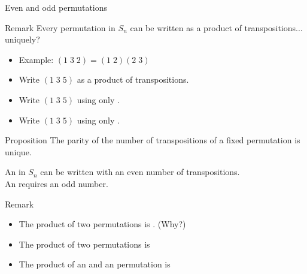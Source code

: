 \documentclass[8pt, handout]{beamer}
\newcommand{\Pause}{}
\begin{document}
\begin{frame}{Even and odd permutations} %
  
  \begin{exampleblock}{Remark}
    Every permutation in $S_n$ can be written as a product of transpositions... \alert{uniquely?}
  \end{exampleblock}
  
  \medskip\Pause

  \begin{itemize}
    \item Example: $(1\; 3\; 2) = (1\; 2) (2\; 3)$ \Pause
    \item Write $(1\; 3\; 5)$ as a product of transpositions. \Pause
    \item Write $(1\; 3\; 5)$ using only .
    \item Write $(1\; 3\; 5)$ using only .
  \end{itemize}
  
  \medskip\Pause
  
  \begin{block}{Proposition}
    The \alert{parity} of the number of transpositions of a fixed
    permutation is unique.
  \end{block}
  
  \Pause

  \begin{definition}
    An  in $S_n$ can be written with an even
    number of transpositions. \\
    An  requires an odd number.
  \end{definition}

  \Pause
  
  \begin{exampleblock}{Remark}
    \begin{itemize}
    \item The product of two  permutations is . (Why?) \Pause
    \item The product of two  permutations is \Pause
    \item The product of an  and an  permutation is 
    \end{itemize}
  \end{exampleblock}


\end{frame}

\end{document}
